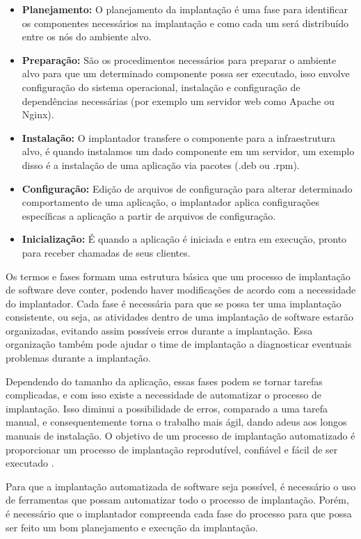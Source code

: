 \begin{itemize}
  \item  \textbf{Planejamento:} O planejamento da implantação é uma fase
  para identificar os componentes necessários na implantação e como cada um será
  distribuído entre os nós do ambiente alvo.
  \item  \textbf{Preparação:} São os procedimentos necessários para preparar o
  ambiente alvo para que um determinado componente possa ser executado, isso envolve
  configuração do sistema operacional, instalação e configuração de dependências
  necessárias (por exemplo um servidor web como Apache ou Nginx). 
  \item  \textbf{Instalação:} O implantador transfere o componente para a infraestrutura
  alvo, é quando instalamos um dado componente em um servidor, um exemplo disso
  é a instalação de uma aplicação via pacotes (.deb ou .rpm).
  \item  \textbf{Configuração:} Edição de arquivos de configuração para alterar
  determinado comportamento de uma aplicação, o implantador aplica configurações
  específicas a aplicação a partir de arquivos de configuração.
  \item  \textbf{Inicialização:} É quando a aplicação é iniciada e entra em execução,
  pronto para receber chamadas de seus clientes.
\end{itemize}

Os termos e fases formam uma estrutura básica que um processo de implantação de software
deve conter, podendo haver modificações de acordo com a necessidade do implantador. 
Cada fase é necessária para que se possa ter uma implantação consistente, ou seja, as
atividades dentro de uma implantação de software estarão organizadas, evitando assim
possíveis erros durante a implantação. Essa organização também pode ajudar o
time de implantação a diagnosticar eventuais problemas durante a implantação.

Dependendo do tamanho da aplicação, essas fases podem se tornar tarefas complicadas,
e com isso existe a necessidade de automatizar o processo de implantação. Isso 
diminui a possibilidade de erros, comparado a uma tarefa manual, e consequentemente
torna o trabalho mais ágil, dando adeus aos longos manuais de instalação. 
O objetivo de um processo de implantação automatizado é proporcionar um processo
 de implantação reprodutível, confiável e fácil de ser executado \cite{humble2010}.

Para que a implantação automatizada de software seja possível, é necessário o uso
de ferramentas que possam automatizar todo o processo de implantação. Porém, é 
necessário que o implantador compreenda cada fase do processo para que possa ser
feito um bom planejamento e execução da implantação.

